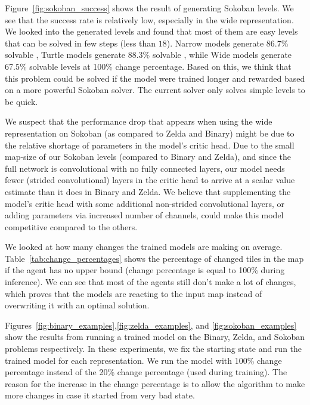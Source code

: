 \documentclass[letterpaper]{article} %
\begin{document}
Figure~\ref{fig:sokoban_success} shows the result of generating Sokoban levels. We see that the success rate is relatively low, especially in the wide representation. We looked into the generated levels and found that most of them are easy levels that can be solved in few steps (less than $18$). Narrow models generate 86.7\% solvable 
, Turtle models generate 88.3\% solvable 
, while Wide models generate 67.5\% solvable levels 
at 100\% change percentage. Based on this, we think that this problem could be solved if the model were trained longer and rewarded based on a more powerful Sokoban solver. The current solver only solves simple levels to be quick. 

We suspect that the performance drop that appears when using the wide representation on Sokoban (as compared to Zelda and Binary) might be due to the relative shortage of parameters in the model's critic head. Due to the small map-size of our Sokoban levels (compared to Binary and Zelda), and since the full network is convolutional with no fully connected layers, our model needs fewer (strided convolutional) layers in the critic head to arrive at a scalar value estimate than it does in Binary and Zelda. We believe that supplementing the model’s critic head with some additional non-strided convolutional layers, or adding parameters via increased number of channels, could make this model competitive compared to the others.

We looked at how many changes the trained models are making on average. Table~\ref{tab:change_percentages} shows the percentage of changed tiles in the map if the agent has no upper bound (change percentage is equal to 100\% during inference). We can see that most of the agents still don't make a lot of changes, which proves that the models are reacting to the input map instead of overwriting it with an optimal solution. 

Figures~\ref{fig:binary_examples},\ref{fig:zelda_examples}, and \ref{fig:sokoban_examples} show the results from running a trained model on the Binary, Zelda, and Sokoban problems respectively. In these experiments, we fix the starting state and run the trained model for each representation. We run the model with 100\% change percentage instead of the 20\% change percentage (used during training). The reason for the increase in the change percentage is to allow the algorithm to make more changes in case it started from very bad state.
\end{document}
